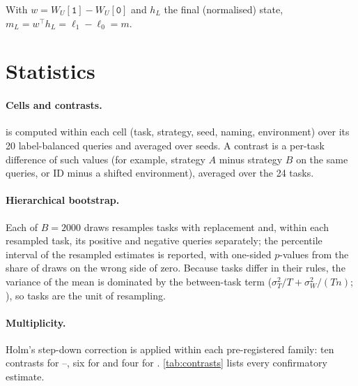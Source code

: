 \begin{lemma}
With $w = W_U[\texttt{1}] - W_U[\texttt{0}]$ and $h_L$ the final (normalised) state, $m_L = w^\top h_L = \ell_1 - \ell_0 = m$.
\end{lemma}

\section{Statistics}

\paragraph{Cells and contrasts.}
\AUROC is computed within each cell (task, strategy, seed, naming, environment) over its 20 label-balanced queries and averaged over seeds.
A contrast is a per-task difference of such values (for example, strategy $A$ minus strategy $B$ on the same queries, or ID minus a shifted environment), averaged over the 24 tasks.

\paragraph{Hierarchical bootstrap.}
Each of $B = 2000$ draws resamples tasks with replacement and, within each resampled task, its positive and negative queries separately; the percentile interval of the resampled estimates is reported, with one-sided $p$-values from the share of draws on the wrong side of zero.
Because tasks differ in their rules, the variance of the mean is dominated by the between-task term ($\sigma_T^2/T + \sigma_W^2/(Tn)$; \citealp{cochran1977sampling}), so tasks are the unit of resampling.

\paragraph{Multiplicity.}
Holm's step-down correction \citep{holm1979simple} is applied within each pre-registered family: ten contrasts for --, six for \sata and four for \satami.
\autoref{tab:contrasts} lists every confirmatory estimate.

